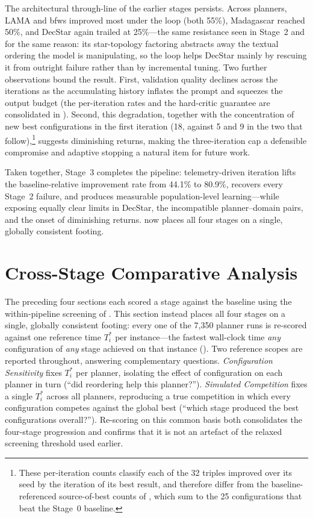 The architectural through-line of the earlier stages persists. Across planners, LAMA and \gls{bfws} improved most under the loop (both 55\%), Madagascar reached 50\%, and DecStar again trailed at 25\%---the same resistance seen in Stage~2 and for the same reason: its star-topology factoring abstracts away the textual ordering the model is manipulating, so the loop helps DecStar mainly by rescuing it from outright failure rather than by incremental tuning. Two further observations bound the result. First, validation quality declines across the iterations as the accumulating history inflates the prompt and squeezes the output budget (the per-iteration rates and the hard-critic guarantee are consolidated in ). Second, this degradation, together with the concentration of new best configurations in the first iteration (18, against 5 and 9 in the two that follow),\footnote{These per-iteration counts classify each of the 32 triples improved over its seed by the iteration of its best result, and therefore differ from the baseline-referenced source-of-best counts of , which sum to the 25 configurations that beat the Stage~0 baseline.} suggests diminishing returns, making the three-iteration cap a defensible compromise and adaptive stopping a natural item for future work.

Taken together, Stage~3 completes the pipeline: telemetry-driven iteration lifts the baseline-relative improvement rate from 44.1\% to 80.9\%, recovers every Stage~2 failure, and produces measurable population-level learning---while exposing equally clear limits in DecStar, the incompatible planner--domain pairs, and the onset of diminishing returns.  now places all four stages on a single, globally consistent footing.

\section{Cross-Stage Comparative Analysis}
\label{sec:results:cross_stage}

The preceding four sections each scored a stage against the baseline using the within-pipeline screening of . This section instead places all four stages on a single, globally consistent footing: every one of the 7{,}350 planner runs is re-scored against one reference time $T^*_i$ per instance---the fastest wall-clock time \emph{any} configuration of \emph{any} stage achieved on that instance (). Two reference scopes are reported throughout, answering complementary questions. \emph{Configuration Sensitivity} fixes $T^*_i$ per planner, isolating the effect of configuration on each planner in turn (``did reordering help this planner?''). \emph{Simulated Competition} fixes a single $T^*_i$ across all planners, reproducing a true competition in which every configuration competes against the global best (``which stage produced the best configurations overall?''). Re-scoring on this common basis both consolidates the four-stage progression and confirms that it is not an artefact of the relaxed screening threshold used earlier.

